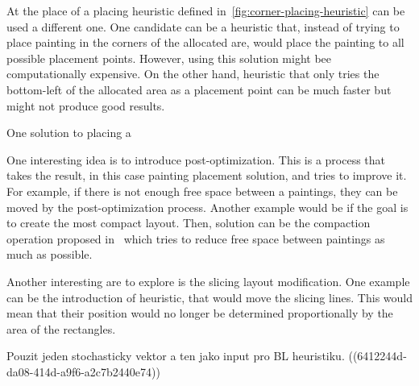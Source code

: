 At the place of a placing heuristic defined in~\ref{fig:corner-placing-heuristic} can be used a different one.
One candidate can be a heuristic that, instead of trying to place painting in the corners of the allocated are,
would place the painting to all possible placement points.
However, using this solution might bee computationally expensive.
On the other hand, heuristic that only tries the bottom-left of the allocated area as a placement point can be much faster but
might not produce good results.

One solution to placing a


One interesting idea is to introduce post-optimization.
This is a process that takes the result, in this case painting placement solution,
and tries to improve it.
For example, if there is not enough free space between a paintings, they can be moved by the post-optimization process.
Another example would be if the goal is to create the most compact layout.
Then, solution can be the compaction operation proposed in~\cite{laiSlicingTreeComplete2001}
which tries to reduce free space between paintings as much as possible.


Another interesting are to explore is the slicing layout modification.
One example can be the introduction of heuristic, that would move the slicing lines.
This would mean that their position would no longer be determined proportionally by the area of the rectangles.


Pouzit jeden stochasticky vektor a ten jako input pro BL heuristiku.
((6412244d-da08-414d-a9f6-a2c7b2440e74))








